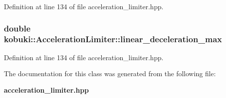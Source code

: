 \-Definition at line 134 of file acceleration\-\_\-limiter.\-hpp.

\subsubsection[{linear\-\_\-deceleration\-\_\-max}]{\setlength{\rightskip}{0pt plus 5cm}double {\bf kobuki\-::\-Acceleration\-Limiter\-::linear\-\_\-deceleration\-\_\-max}\hspace{0.3cm}{\ttfamily  [private]}}\label{classkobuki_1_1AccelerationLimiter_ab9d7e7921aa359762a4e62776fad2447}


\-Definition at line 134 of file acceleration\-\_\-limiter.\-hpp.



\-The documentation for this class was generated from the following file\-:\begin{DoxyCompactItemize}
\item 
{\bf acceleration\-\_\-limiter.\-hpp}\end{DoxyCompactItemize}
